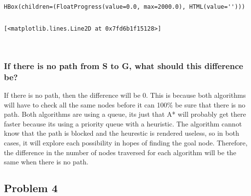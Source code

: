 \documentclass[11pt]{article}
\makeatletter
\newcommand{\boxspacing}{\kern\kvtcb@left@rule\kern\kvtcb@boxsep}
\newcommand{\prompt}[4]{
        {\ttfamily\llap{{\color{#2}[#3]:\hspace{3pt}#4}}\vspace{-\baselineskip}}
    }
\makeatother
\begin{document}
    
    \begin{Verbatim}[commandchars=\\\{\}]
HBox(children=(FloatProgress(value=0.0, max=2000.0), HTML(value='')))
    \end{Verbatim}

    
    \begin{Verbatim}[commandchars=\\\{\}]

    \end{Verbatim}

            \begin{tcolorbox}[breakable, size=fbox, boxrule=.5pt, pad at break*=1mm, opacityfill=0]
\prompt{Out}{outcolor}{ }{\boxspacing}
\begin{Verbatim}[commandchars=\\\{\}]
[<matplotlib.lines.Line2D at 0x7fd6b1f15128>]
\end{Verbatim}
\end{tcolorbox}
        
    \begin{center}
    \end{center}
    { \hspace*{\fill} \\}
    
    \hypertarget{if-there-is-no-path-from-s-to-g-what-should-this-difference-be}{%
\subsubsection{If there is no path from S to G, what should this
difference
be?}\label{if-there-is-no-path-from-s-to-g-what-should-this-difference-be}}

If there is no path, then the difference will be 0. This is because both
algorithms will have to check all the same nodes before it can 100\% be
sure that there is no path. Both algorithms are using a queue, its just
that A* will probably get there faster because its using a priority
queue with a heuristic. The algorithm cannot know that the path is
blocked and the heurestic is rendered useless, so in both cases, it will
explore each possibility in hopes of finding the goal node. Therefore,
the difference in the number of nodes traversed for each algorithm will
be the same when there is no path.

    \hypertarget{problem-4}{%
\subsection{Problem 4}\label{problem-4}}
\end{document}
